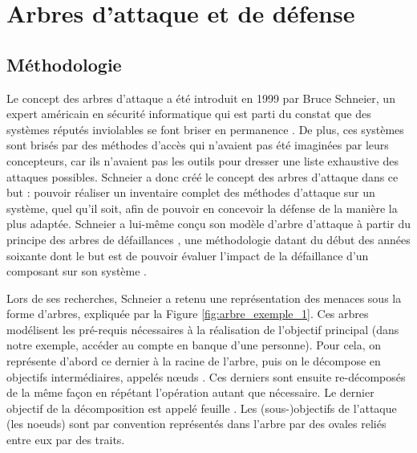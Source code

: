 \section{Arbres d'attaque et de défense}
	\label{sec:etat_art}

    \subsection{Méthodologie}
        Le concept des arbres d'attaque a été introduit en 1999 par Bruce Schneier, un expert américain en sécurité informatique qui est parti du constat que des systèmes réputés \og inviolables \fg se font briser en permanence \cite{doc_Schneier}. De plus, ces systèmes sont brisés par des méthodes d'accès qui n'avaient pas été imaginées par leurs concepteurs, car ils n'avaient pas les outils pour dresser une liste exhaustive des attaques possibles. Schneier a donc créé le concept des arbres d'attaque dans ce but : pouvoir réaliser un inventaire complet des méthodes d'attaque sur un système, quel qu'il soit, afin de pouvoir en concevoir la défense de la manière la plus adaptée. Schneier a lui-même conçu son modèle d'arbre d'attaque à partir du principe des \og arbres de défaillances \fg, une méthodologie datant du début des années soixante dont le but est de pouvoir évaluer l'impact de la défaillance d'un composant sur son système \cite{defaillanceTree}.

        Lors de ses recherches, Schneier a retenu une représentation des menaces sous la forme d'arbres, expliquée par la Figure \ref{fig:arbre_exemple_1}. Ces arbres modélisent les pré-requis nécessaires à la réalisation de l'objectif principal (dans notre exemple, accéder au compte en banque d'une personne). Pour cela, on représente d'abord ce dernier à la racine de l'arbre, puis on le décompose en objectifs intermédiaires, appelés \og nœuds \fg. Ces derniers sont ensuite re-décomposés de la même façon en répétant l'opération autant que nécessaire. Le dernier objectif de la décomposition est appelé \og feuille \fg. Les (sous-)objectifs de l'attaque (les noeuds) sont par convention représentés dans l'arbre par des ovales reliés entre eux par des traits. 

